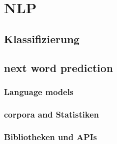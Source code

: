 \section{NLP}

\subsection{Klassifizierung}
\subsection{next word prediction}
  \subsubsection{Language models}
  \subsubsection{corpora and Statistiken}
  \subsubsection{Bibliotheken und APIs}
    
